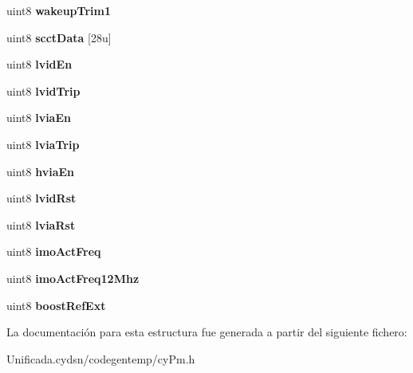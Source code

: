 \begin{DoxyCompactItemize}
uint8 {\bfseries wakeup\+Trim1}
\item 
\mbox{\label{structcy_pm_backup_struct_a5fd33adf770e7f63657d92bcb667d86d}} 
uint8 {\bfseries scct\+Data} \mbox{[}28u\mbox{]}
\item 
\mbox{\label{structcy_pm_backup_struct_a55f09bf57ace6636a08c0e8bce556b7d}} 
uint8 {\bfseries lvid\+En}
\item 
\mbox{\label{structcy_pm_backup_struct_a1ce4e80ea55bd2a8e5893eee50b9acda}} 
uint8 {\bfseries lvid\+Trip}
\item 
\mbox{\label{structcy_pm_backup_struct_a35d96c70a25d897435de910206dbf027}} 
uint8 {\bfseries lvia\+En}
\item 
\mbox{\label{structcy_pm_backup_struct_ab483d7add8d17cb28370cb9dfbb3cfc2}} 
uint8 {\bfseries lvia\+Trip}
\item 
\mbox{\label{structcy_pm_backup_struct_a64a87cb42971133016844cb09487f509}} 
uint8 {\bfseries hvia\+En}
\item 
\mbox{\label{structcy_pm_backup_struct_a1ae1ad6ed5a59e3c13a8326220835cde}} 
uint8 {\bfseries lvid\+Rst}
\item 
\mbox{\label{structcy_pm_backup_struct_ab0227c4d38afd10377d6d86a400a93c0}} 
uint8 {\bfseries lvia\+Rst}
\item 
\mbox{\label{structcy_pm_backup_struct_a28aa6e707757c3aa87be61c3444ffdad}} 
uint8 {\bfseries imo\+Act\+Freq}
\item 
\mbox{\label{structcy_pm_backup_struct_a7bd7b284dd487b8dc3014c6fda242464}} 
uint8 {\bfseries imo\+Act\+Freq12\+Mhz}
\item 
\mbox{\label{structcy_pm_backup_struct_a2f93b646cd04ea41c2f2c83dcf886124}} 
uint8 {\bfseries boost\+Ref\+Ext}
\end{DoxyCompactItemize}


La documentación para esta estructura fue generada a partir del siguiente fichero\+:\begin{DoxyCompactItemize}
\item 
Unificada.\+cydsn/codegentemp/cy\+Pm.\+h\end{DoxyCompactItemize}
